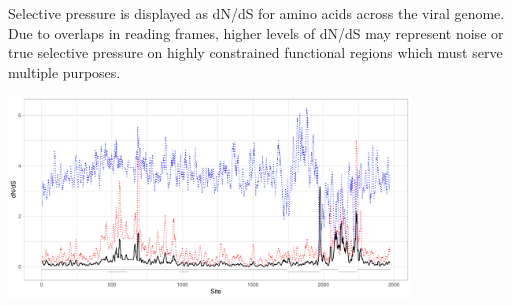 \documentclass[11pt]{article}
\begin{document}
\begin{suppfigure}
\centering
\caption{
Selective pressure is displayed as dN/dS for amino acids across the viral genome. Due to overlaps in reading frames, higher levels of dN/dS may represent noise or true selective pressure on highly constrained functional regions which must serve multiple purposes.
}
\includegraphics[width=0.8\textwidth]{supplementaryinfo/selectionplot.pdf}
\label{fig:genetree5}
\end{suppfigure}
\clearpage
%
\end{document}
